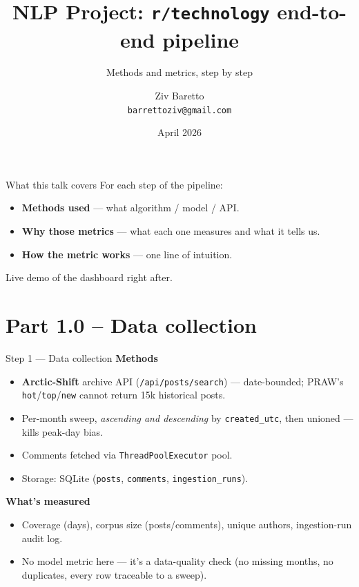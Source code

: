 \documentclass[10pt,aspectratio=169]{beamer}
\title{NLP Project: \texttt{r/technology} end-to-end pipeline}
\subtitle{Methods and metrics, step by step}
\author{Ziv Baretto \\ \footnotesize\texttt{barrettoziv@gmail.com}}
\institute{Ashoka University -- CS-4420-1}
\date{April 2026}
\begin{document}
\maketitle

\begin{frame}{What this talk covers}
For each step of the pipeline:
\begin{itemize}
  \item \textbf{Methods used} — what algorithm / model / API.
  \item \textbf{Why those metrics} — what each one measures and what it tells us.
  \item \textbf{How the metric works} — one line of intuition.
\end{itemize}
Live demo of the dashboard right after.
\end{frame}

\section{Part 1.0 -- Data collection}

\begin{frame}{Step 1 — Data collection}
\textbf{Methods}
\begin{itemize}
  \item \textbf{Arctic-Shift} archive API (\texttt{/api/posts/search}) — date-bounded; PRAW's \texttt{hot}/\texttt{top}/\texttt{new} cannot return 15k historical posts.
  \item Per-month sweep, \emph{ascending and descending} by \texttt{created\_utc}, then unioned — kills peak-day bias.
  \item Comments fetched via \texttt{ThreadPoolExecutor} pool.
  \item Storage: SQLite (\texttt{posts}, \texttt{comments}, \texttt{ingestion\_runs}).
\end{itemize}

\medskip
\textbf{What's measured}
\begin{itemize}
  \item Coverage (days), corpus size (posts/comments), unique authors, ingestion-run audit log.
  \item No model metric here — it's a data-quality check (no missing months, no duplicates, every row traceable to a sweep).
\end{itemize}
\end{frame}
\end{document}
